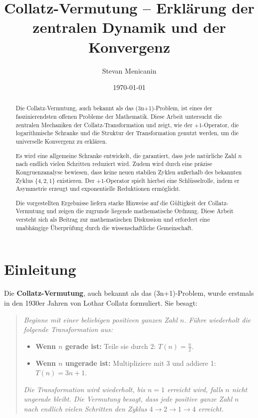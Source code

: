 \documentclass[a4paper,12pt]{article}
\title{Collatz-Vermutung – Erklärung der zentralen Dynamik und der Konvergenz}
\author{Stevan Menicanin}
\date{\today}
\begin{document}
\maketitle

\begin{abstract}
    Die Collatz-Vermutung, auch bekannt als das (3n+1)-Problem, ist eines der faszinierendsten offenen Probleme der Mathematik. Diese Arbeit untersucht die zentralen Mechaniken der Collatz-Transformation und zeigt, wie der \(+1\)-Operator, die logarithmische Schranke und die Struktur der Transformation genutzt werden, um die universelle Konvergenz zu erklären.

    Es wird eine allgemeine Schranke entwickelt, die garantiert, dass jede natürliche Zahl \( n \) nach endlich vielen Schritten reduziert wird. Zudem wird durch eine präzise Kongruenzanalyse bewiesen, dass keine neuen stabilen Zyklen außerhalb des bekannten Zyklus \( \{4, 2, 1\} \) existieren. Der \(+1\)-Operator spielt hierbei eine Schlüsselrolle, indem er Asymmetrie erzeugt und exponentielle Reduktionen ermöglicht.

    Die vorgestellten Ergebnisse liefern starke Hinweise auf die Gültigkeit der Collatz-Vermutung und zeigen die zugrunde liegende mathematische Ordnung. Diese Arbeit versteht sich als Beitrag zur mathematischen Diskussion und erfordert eine unabhängige Überprüfung durch die wissenschaftliche Gemeinschaft.
\end{abstract}





\newpage
\tableofcontents

\newpage

\section{Einleitung}
Die \textbf{Collatz-Vermutung}, auch bekannt als das (3n+1)-Problem, wurde erstmals in den 1930er Jahren von Lothar Collatz formuliert. Sie besagt:

\begin{quote}
\textit{Beginne mit einer beliebigen positiven ganzen Zahl \( n \). Führe wiederholt die folgende Transformation aus:}
\begin{itemize}
    \item \textbf{Wenn \( n \) gerade ist:} Teile sie durch 2: \( T(n) = \frac{n}{2} \).
    \item \textbf{Wenn \( n \) ungerade ist:} Multipliziere mit 3 und addiere 1: \( T(n) = 3n + 1 \).
\end{itemize}
\textit{Die Transformation wird wiederholt, bis \( n = 1 \) erreicht wird, falls \( n \) nicht ungerade bleibt. Die Vermutung besagt, dass jede positive ganze Zahl \( n \) nach endlich vielen Schritten den Zyklus \( 4 \to 2 \to 1 \to 4 \) erreicht.}
\end{quote}
\end{document}

